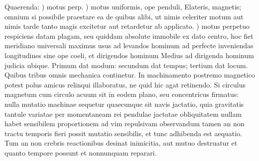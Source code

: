 Quaerenda:%
\newline{}) motus perp.\protect{}%
\newline{}) motus uniformis,\protect{}
ope penduli,\protect{}
Elateris,\protect{}
magnetis;\protect{}
omnium si possibile praestare ea de quibus alibi,
ut nimis celeriter motum aut nimis tarde tanto magis excitetur aut retardetur ab applicato.%
\newline{}) motus
perpetuo respiciens datam plagam, seu quiddam absolute immobile ex dato centro,
hoc fiet meridiano\protect{} universali
\textso{ }%
maximus usus ad levandos hominum
%
\newline\indent%
ad perfecte inveniendas longitudines sine ope coeli, et dirigendos hominum
\newline\indent%
Medius ad dirigenda hominum judicia ubique. Primum  dat modum: secundum dat tempus; tertium  dat locum. Quibus tribus omnis mechanica continetur. In machinamento postremo magnetico  potest polus amicus relinqui illaboratus, ne  quid hic agat retinendo. Si circulus  magnetum cum circulo acuum sit in eodem  plano, seu concentricus firmatus: nulla mutatio  machinae sequetur quaecunque sit navis jactatio,  quia gravitatis\protect{} tantule variatae per momentaneam rei pendulae jactatae obliquitatem nullam  habet sensibilem proportionem ad vim repulsivam  observandum tamen an  non tractu temporis fieri possit mutatio sensibilis, et  tunc adhibenda est aequatio. Tum an non crebris  reactionibus desinat inimicitia, aut mutuo destruatur  et quanto tempore possunt et nonnunquam  reparari.  \pend%
\pstart%
\pend 
 


 


 


 


 


 


 

